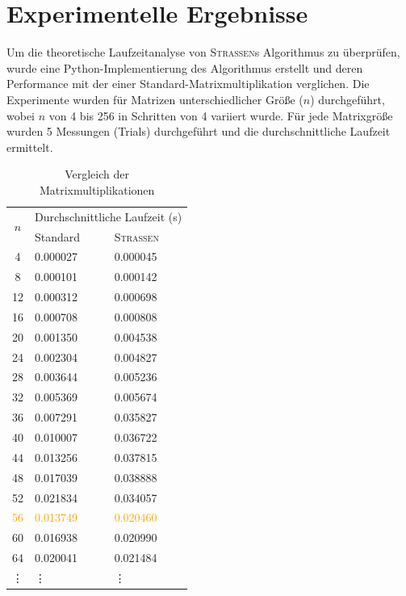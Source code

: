 \documentclass{scrartcl}
\numberwithin{equation}{section}
\begin{document}
\section{Experimentelle Ergebnisse}
Um die theoretische Laufzeitanalyse von \textsc{Strassen}s Algorithmus zu überprüfen, wurde eine Python-Implementierung des Algorithmus erstellt und deren Performance mit der einer Standard-Matrixmultiplikation verglichen. Die Experimente wurden für Matrizen unterschiedlicher Größe ($n$) durchgeführt, wobei $n$ von 4 bis 256 in Schritten von 4 variiert wurde. Für jede Matrixgröße wurden 5 Messungen (Trials) durchgeführt und die durchschnittliche Laufzeit ermittelt.
\begin{table}[h!]
	\centering
	\caption{Vergleich der Matrixmultiplikationen}
	\label{tab:strassen-results}
	\begin{tabular}{c|m{3.3cm}|m{3.3cm}}
		\hline
		\multirow{2}{*}{$n$} & \multicolumn{2}{c}{Durchschnittliche Laufzeit (s)} \\ %
		\cline{2-3} %
		& Standard & \textsc{Strassen} \\ %
		\hline
		\hline
		4 & 0.000027 & 0.000045 \\ 
		8 & 0.000101 & 0.000142 \\ 
		12 & 0.000312 & 0.000698 \\ 
		16 & 0.000708 & 0.000808 \\ 
		20 & 0.001350 & 0.004538 \\  
		24 & 0.002304 & 0.004827 \\ 
		28 & 0.003644 & 0.005236 \\ 
		32 & 0.005369 & 0.005674 \\ 
		36 & 0.007291 & 0.035827 \\ 
		40 & 0.010007 & 0.036722 \\ 
		44 & 0.013256 & 0.037815 \\ 
		48 & 0.017039 & 0.038888 \\ 
		52 & 0.021834 & 0.034057 \\ 
		\textcolor{orange}{56} & \textcolor{orange}{0.013749} & \textcolor{orange}{0.020460} \\ 
		60 & 0.016938 & 0.020990 \\ 
		64 & 0.020041 & 0.021484 \\ 
		\vdots & \vdots & \vdots \\ 

\end{tabular}
\end{table}
\end{document}
